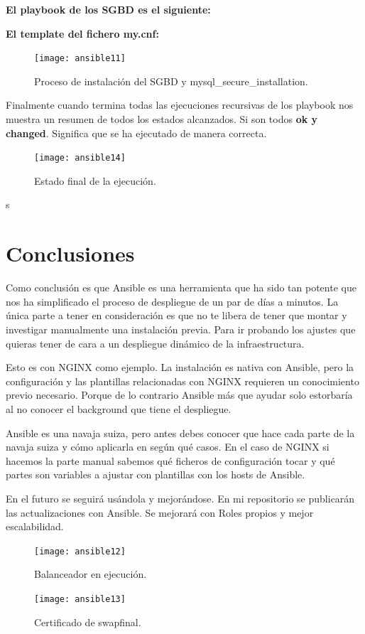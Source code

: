 \textbf{El playbook de los SGBD es el siguiente:}
\vspace{5mm}

\vspace{5mm}

\textbf{El template del fichero my.cnf:}
\vspace{5mm}

\vspace{5mm}

\begin{figure}[H]
	\centering
	\texttt{[image: ansible11]}
	\caption{Proceso de instalación del SGBD y mysql\_secure\_installation.}
\end{figure}

Finalmente cuando termina todas las ejecuciones recursivas de los playbook nos muestra un resumen de todos los estados alcanzados. Si son todos \textbf{ok y changed}. Significa que se ha ejecutado de manera correcta.
\begin{figure}[H]
	\centering
	\texttt{[image: ansible14]}
	\caption{Estado final de la ejecución.}
\end{figure}
s
\newpage
\section{Conclusiones}

Como conclusión es que Ansible es una herramienta que ha sido tan potente que nos ha simplificado el proceso de despliegue de un par de días a minutos. La única parte a tener en consideración es que no te libera de tener que montar y investigar manualmente una instalación previa. Para ir probando los ajustes que quieras tener de cara a un despliegue dinámico de la infraestructura.
\vspace{5mm}

Esto es con NGINX como ejemplo. La instalación es nativa con Ansible, pero la configuración y las plantillas relacionadas con NGINX requieren un conocimiento previo necesario. Porque de lo contrario Ansible más que ayudar solo estorbaría al no conocer el background que tiene el despliegue.

Ansible es una navaja suiza, pero antes debes conocer que hace cada parte de la navaja suiza y cómo aplicarla en según qué casos. En el caso de NGINX si hacemos la parte manual sabemos qué ficheros de configuración tocar y qué partes son variables a ajustar con plantillas con los hosts de Ansible.

En el futuro se seguirá usándola y mejorándose. En mi repositorio se publicarán las actualizaciones con Ansible. Se mejorará con Roles propios y mejor escalabilidad.

\begin{figure}[H]
	\centering
	\texttt{[image: ansible12]}
	\caption{Balanceador en ejecución.}
\end{figure}

\begin{figure}[H]
	\centering
	\texttt{[image: ansible13]}
	\caption{Certificado de swapfinal.}
\end{figure}
